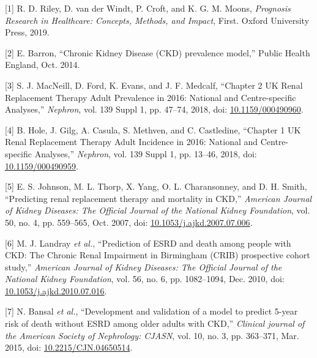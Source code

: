 \documentclass[12pt,twoside]{reedthesis}
\newenvironment{cslreferences}%
  {}%
  {\par}
\begin{document}
\hypertarget{refs}{}
\begin{cslreferences}
\leavevmode\hypertarget{ref-riley_prognosis_2019}{}%
{[}1{]} R. D. Riley, D. van der Windt, P. Croft, and K. G. M. Moons, \emph{Prognosis Research in Healthcare: Concepts, Methods, and Impact}, First. Oxford University Press, 2019.

\leavevmode\hypertarget{ref-barron_chronic_2014-1}{}%
{[}2{]} E. Barron, ``Chronic Kidney Disease (CKD) prevalence model,'' Public Health England, Oct. 2014.

\leavevmode\hypertarget{ref-macneill_chapter_2018}{}%
{[}3{]} S. J. MacNeill, D. Ford, K. Evans, and J. F. Medcalf, ``Chapter 2 UK Renal Replacement Therapy Adult Prevalence in 2016: National and Centre-specific Analyses,'' \emph{Nephron}, vol. 139 Suppl 1, pp. 47--74, 2018, doi: \href{https://doi.org/10.1159/000490960}{10.1159/000490960}.

\leavevmode\hypertarget{ref-hole_chapter_2018}{}%
{[}4{]} B. Hole, J. Gilg, A. Casula, S. Methven, and C. Castledine, ``Chapter 1 UK Renal Replacement Therapy Adult Incidence in 2016: National and Centre-specific Analyses,'' \emph{Nephron}, vol. 139 Suppl 1, pp. 13--46, 2018, doi: \href{https://doi.org/10.1159/000490959}{10.1159/000490959}.

\leavevmode\hypertarget{ref-johnson_predicting_2007}{}%
{[}5{]} E. S. Johnson, M. L. Thorp, X. Yang, O. L. Charansonney, and D. H. Smith, ``Predicting renal replacement therapy and mortality in CKD,'' \emph{American Journal of Kidney Diseases: The Official Journal of the National Kidney Foundation}, vol. 50, no. 4, pp. 559--565, Oct. 2007, doi: \href{https://doi.org/10.1053/j.ajkd.2007.07.006}{10.1053/j.ajkd.2007.07.006}.

\leavevmode\hypertarget{ref-landray_prediction_2010}{}%
{[}6{]} M. J. Landray \emph{et al.}, ``Prediction of ESRD and death among people with CKD: The Chronic Renal Impairment in Birmingham (CRIB) prospective cohort study,'' \emph{American Journal of Kidney Diseases: The Official Journal of the National Kidney Foundation}, vol. 56, no. 6, pp. 1082--1094, Dec. 2010, doi: \href{https://doi.org/10.1053/j.ajkd.2010.07.016}{10.1053/j.ajkd.2010.07.016}.

\leavevmode\hypertarget{ref-bansal_development_2015-1}{}%
{[}7{]} N. Bansal \emph{et al.}, ``Development and validation of a model to predict 5-year risk of death without ESRD among older adults with CKD,'' \emph{Clinical journal of the American Society of Nephrology: CJASN}, vol. 10, no. 3, pp. 363--371, Mar. 2015, doi: \href{https://doi.org/10.2215/CJN.04650514}{10.2215/CJN.04650514}.


\end{cslreferences}
\end{document}
